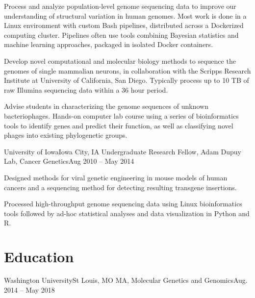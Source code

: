             {Process and analyze population-level genome sequencing data to improve our understanding of structural variation in human genomes. Most work is done in a Linux environment with custom Bash pipelines, distributed across a Dockerized computing cluster. Pipelines often use tools combining Bayesian statistics and machine learning approaches, packaged in isolated Docker containers.}
            
            {Develop novel computational and molecular biology methods to sequence the genomes of single mammalian neurons, in collaboration with the Scripps Research Institute at University of California, San Diego. Typically process up to 10 TB of raw Illumina sequencing data within a 36 hour period.}
            
            {Advise students in characterizing the genome sequences of unknown bacteriophages. Hands-on computer lab course using a series of bioinformatics tools to identify genes and predict their function, as well as classifying novel phages into existing phylogenetic groups.}

        \resumeItemListEnd

        \resumeSubheading
        {University of Iowa}{Iowa City, IA}
        {Undergraduate Research Fellow, Adam Dupuy Lab, Cancer Genetics}{Aug 2010 -- May 2014}

        \resumeItemListStart

            {Designed methods for viral genetic engineering in mouse models of human cancers and a sequencing method for detecting resulting transgene insertions.}
            
            {Processed high-throughput genome sequencing data using Linux bioinformatics tools followed by ad-hoc statistical analyses and data visualization in Python and R.}

        \resumeItemListEnd

    \resumeSubHeadingListEnd

\section{Education}
   \resumeSubHeadingListStart
   
      \resumeSubheading
      {Washington University}{St Louis, MO}
      {MA, Molecular Genetics and Genomics}{Aug. 2014 -- May 2018}
      
